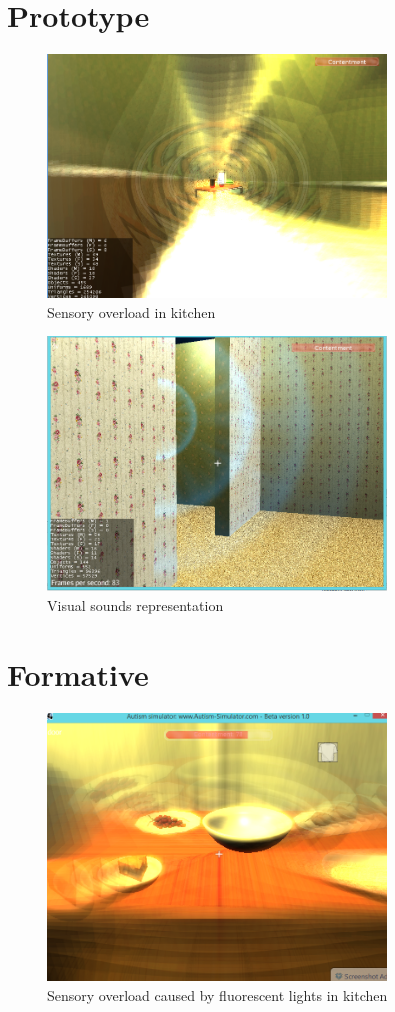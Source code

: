 \chapter{Prototype}

\begin{figure}[H]
\centering
\includegraphics[width=90mm]{images/prototype/overload_livingroom.png}
\caption{Sensory overload in kitchen}
\label{old_house}
\end{figure}

\begin{figure}[H]
\centering
\includegraphics[width=90mm]{images/prototype/visualsounds.png}
\caption{Visual sounds representation}
\label{old_house}
\end{figure}

\chapter{Formative}
\begin{figure}[H]
\centering
\includegraphics[width=90mm]{images/implementationfirst/gameimages/breakfast_overload.png}
\caption{Sensory overload caused by fluorescent lights in kitchen}
\label{old_house}
\end{figure}

